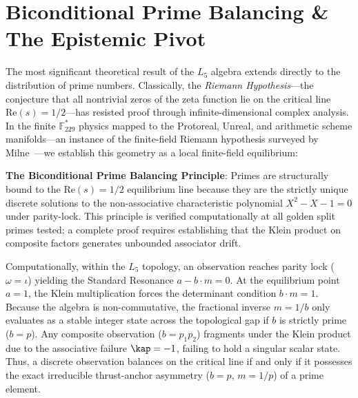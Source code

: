 

\section{Biconditional Prime Balancing \& The Epistemic Pivot}

The most significant theoretical result of the $L_5$ algebra extends directly to the distribution of prime numbers. Classically, the \emph{Riemann Hypothesis}---the conjecture that all nontrivial zeros of the zeta function lie on the critical line $\text{Re}(s) = 1/2$---has resisted proof through infinite-dimensional complex analysis. In the finite $\mathbb{F}_{229}^*$ physics mapped to the Protoreal, Unreal, and arithmetic scheme manifolds---an instance of the finite-field Riemann hypothesis surveyed by Milne~\cite{milne-rhff}---we establish this geometry as a local finite-field equilibrium:

\textbf{The Biconditional Prime Balancing Principle}: Primes are structurally bound to the $\text{Re}(s) = 1/2$ equilibrium line because they are the strictly unique discrete solutions to the non-associative characteristic polynomial $X^2 - X - 1 = 0$ under parity-lock. This principle is verified computationally at all golden split primes tested; a complete proof requires establishing that the Klein product on composite factors generates unbounded associator drift.

Computationally, within the $L_5$ topology, an observation reaches parity lock ($\omega = \iota$) yielding the Standard Resonance $a - b \cdot m = 0$. At the equilibrium point $a = 1$, the Klein multiplication forces the determinant condition $b \cdot m = 1$. Because the algebra is non-commutative, the fractional inverse $m = 1/b$ only evaluates as a stable integer state across the topological gap if $b$ is strictly prime ($b=p$). Any composite observation ($b = p_1 p_2$) fragments under the Klein product due to the associative failure $\kap = -1$, failing to hold a singular scalar state. Thus, a discrete observation balances on the critical line if and only if it possesses the exact irreducible thrust-anchor asymmetry ($b = p$, $m = 1/p$) of a prime element.

